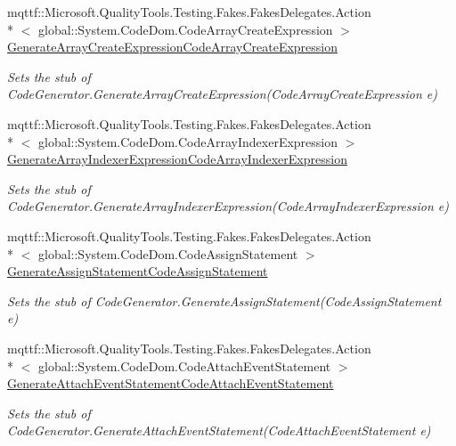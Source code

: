 \begin{DoxyCompactItemize}
mqttf\-::\-Microsoft.\-Quality\-Tools.\-Testing.\-Fakes.\-Fakes\-Delegates.\-Action\\*
$<$ global\-::\-System.\-Code\-Dom.\-Code\-Array\-Create\-Expression $>$ \hyperlink{class_system_1_1_code_dom_1_1_compiler_1_1_fakes_1_1_stub_code_generator_abd016671873387d9fe3005e8ae1a4e7a}{Generate\-Array\-Create\-Expression\-Code\-Array\-Create\-Expression}
\begin{DoxyCompactList}\small\item\em Sets the stub of Code\-Generator.\-Generate\-Array\-Create\-Expression(\-Code\-Array\-Create\-Expression e)\end{DoxyCompactList}\item 
mqttf\-::\-Microsoft.\-Quality\-Tools.\-Testing.\-Fakes.\-Fakes\-Delegates.\-Action\\*
$<$ global\-::\-System.\-Code\-Dom.\-Code\-Array\-Indexer\-Expression $>$ \hyperlink{class_system_1_1_code_dom_1_1_compiler_1_1_fakes_1_1_stub_code_generator_aacb73e1e2e3f60b4993e072a81dbb8b2}{Generate\-Array\-Indexer\-Expression\-Code\-Array\-Indexer\-Expression}
\begin{DoxyCompactList}\small\item\em Sets the stub of Code\-Generator.\-Generate\-Array\-Indexer\-Expression(\-Code\-Array\-Indexer\-Expression e)\end{DoxyCompactList}\item 
mqttf\-::\-Microsoft.\-Quality\-Tools.\-Testing.\-Fakes.\-Fakes\-Delegates.\-Action\\*
$<$ global\-::\-System.\-Code\-Dom.\-Code\-Assign\-Statement $>$ \hyperlink{class_system_1_1_code_dom_1_1_compiler_1_1_fakes_1_1_stub_code_generator_a1ba5ee0aa81e2c89e3042f9f109451ba}{Generate\-Assign\-Statement\-Code\-Assign\-Statement}
\begin{DoxyCompactList}\small\item\em Sets the stub of Code\-Generator.\-Generate\-Assign\-Statement(\-Code\-Assign\-Statement e)\end{DoxyCompactList}\item 
mqttf\-::\-Microsoft.\-Quality\-Tools.\-Testing.\-Fakes.\-Fakes\-Delegates.\-Action\\*
$<$ global\-::\-System.\-Code\-Dom.\-Code\-Attach\-Event\-Statement $>$ \hyperlink{class_system_1_1_code_dom_1_1_compiler_1_1_fakes_1_1_stub_code_generator_a7a7abb4023e68385e331a324e068f5cd}{Generate\-Attach\-Event\-Statement\-Code\-Attach\-Event\-Statement}
\begin{DoxyCompactList}\small\item\em Sets the stub of Code\-Generator.\-Generate\-Attach\-Event\-Statement(\-Code\-Attach\-Event\-Statement e)\end{DoxyCompactList}\item 

\end{DoxyCompactItemize}
